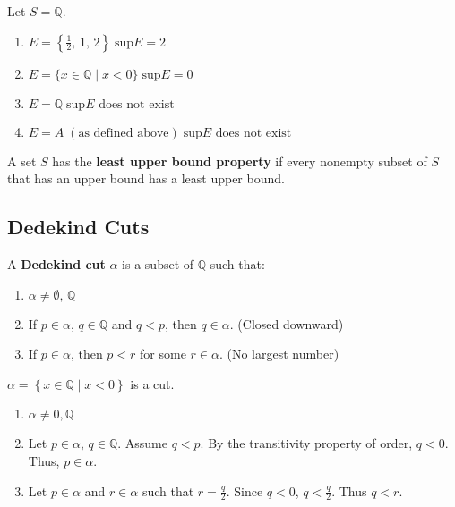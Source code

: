\documentclass[../main.tex]{subfiles}
\begin{document}
\begin{example}[]
    Let \( S = \mathbb{Q} \).
    \begin{enumerate}
        \item \( E = \left\{ \displaystyle \frac{1}{2},\, 1,\, 2 \right\} \; \boxed{ \text{sup}E= 2 } \)
        \item \( E = \{x \in \mathbb{Q} \mid x < 0 \} \; \boxed{\text{sup}E = 0}\)
        \item \( E = \mathbb{Q} \; \boxed{\text{sup}E \text{ does not exist}} \)
        \item \( E = A \; (\text{as defined above}) \; \boxed{\text{sup}E \text{ does not exist}} \)
    \end{enumerate}
\end{example}

\begin{definition}
    A set \( S \) has the \textbf{least upper bound property} if every nonempty subset of \( S \) that has an upper bound has a least upper bound.
\end{definition}


\subsection{Dedekind Cuts}

\begin{definition}
    A \textbf{Dedekind cut} \( \alpha \) is a subset of \( \mathbb{Q} \) such that:
    \begin{enumerate}
        \item \( \alpha  \neq \emptyset, \, \mathbb{Q} \)
        \item If \( p \in \alpha \), \( q \in \mathbb{Q} \) and \( q < p \), then \( q \in \alpha \). (Closed downward)
        \item If \( p \in \alpha \), then \( p < r \) for some \( r \in \alpha \). (No largest number)
    \end{enumerate}
\end{definition}

\begin{example}[]
    \( \alpha = \left\{ x \in \mathbb{Q} \mid x < 0 \right\} \) is a cut.
\end{example}
\begin{enumerate}
    \item \( \alpha \neq 0, \mathbb{Q} \) \checkmark
    \item Let \( p \in \alpha \), \( q \in \mathbb{Q} \). Assume \( q < p \).
    By the transitivity property of order, \( q < 0 \).
    Thus, \( p \in \alpha \). \checkmark
    \item Let \( p \in \alpha \) and \( r \in \alpha \) such that \( r = \displaystyle \frac{q}{2} \).
    Since \( q < 0 \), \( q < \displaystyle \frac{q}{2} \). Thus \( q < r \). \checkmark
\end{enumerate}
\end{document}
